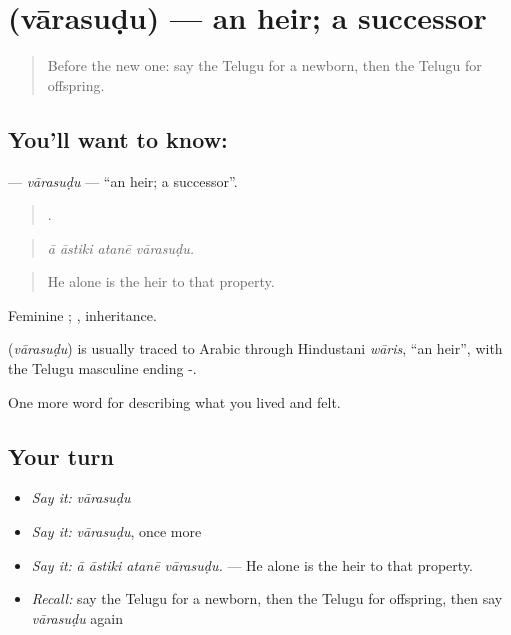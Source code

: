 \section[\texorpdfstring{\te{వారసుడు} (vārasuḍu)}{వారసుడు (vārasuḍu)}]{ (vārasuḍu) — an heir; a successor}

\label{lesson:TE-C531-varasudu}



\begin{quote}
Before the new one: say the Telugu for a newborn, then the Telugu for offspring.
\end{quote}

\subsection*{You'll want to know: }
\textbf{} — \emph{vārasuḍu} — \textquotedblleft{}an heir; a successor\textquotedblright{}.

\begin{quote}
   .
\end{quote}

\begin{quote}
\emph{ā āstiki atanē vārasuḍu.}
\end{quote}

\begin{quote}
He alone is the heir to that property.
\end{quote}

Feminine ; , inheritance.

\begin{cousinweb}
\textbf{} (\emph{vārasuḍu}) is usually traced to Arabic through Hindustani \emph{wāris}, \textquotedblleft{}an heir\textquotedblright{}, with the Telugu masculine ending -.
\end{cousinweb}

\begin{grammarlens}[title={What you've built}]
One more word for describing what you lived and felt.
\end{grammarlens}

\subsection*{Your turn}
\begin{itemize}
\raggedright
  \item \emph{Say it:} \emph{vārasuḍu}
  \item \emph{Say it:} \emph{vārasuḍu}, once more
  \item \emph{Say it:} \emph{ā āstiki atanē vārasuḍu.} — He alone is the heir to that property.
  \item \emph{Recall:} say the Telugu for a newborn, then the Telugu for offspring, then say \emph{vārasuḍu} again
\end{itemize}


